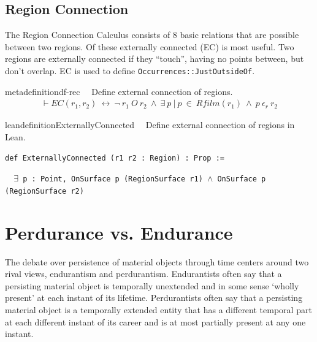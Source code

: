 \subsection{Region Connection}

The Region Connection Calculus \cite{RCC8} consists of 8 basic relations that are possible between two regions.  Of these externally connected (EC) is most useful.  Two regions are externally connected if they ``touch'', having no points between, but don't overlap.  EC is used to define \texttt{Occurrences::JustOutsideOf}.


\begin{restatable}{metadefinition}{df-rec}~~ Define external connection of regions.
\begin{align}
\vdash \textit{EC}(r_1,r_2)~\leftrightarrow~\lnot~r_1~O~r_2~\wedge~\exists~p~\vert~p~\in~\textit{Rfilm}(r_1)~\wedge~p~\epsilon_r~r_2
\label{eq:df-rec}\tag{df-rec}
\end{align}
\end{restatable}

\begin{restatable}{leandefinition}{ExternallyConnected}~~ Define external
connection of regions in Lean.

\texttt{\textcolor{leancolor}{def} \textcolor{leanyellow}{ExternallyConnected} (r1 r2 : Region) : Prop :=}

\texttt{~~$\exists$ p : Point, OnSurface p (RegionSurface r1) $\wedge$ OnSurface p (RegionSurface r2)}
\label{ExternallyConnected}
\end{restatable}




\section{Perdurance vs. Endurance}\label{sec:pervend}

\pn The debate over persistence of material objects through time centers around two rival views, endurantism and perdurantism.  Endurantists often say that a persisting material object is temporally unextended and in some sense ‘wholly present’ at each instant of its lifetime. Perdurantists often say that a persisting material object is a temporally extended entity that has a different temporal part at each different instant of its career and is at most partially present at any one instant.\cite{location-mereology}


